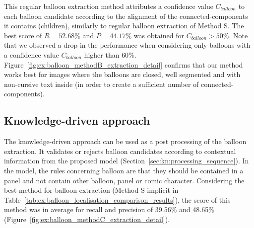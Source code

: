 This regular balloon extraction method attributes a confidence value $C_{balloon}$ to each balloon candidate according to the alignment of the connected-components it contains (children), similarly to regular balloon extraction of Method S.
The best score of $R=52.68\%$ and $P=44.17\%$ was obtained for $C_{balloon} > 50\%$.
Note that we observed a drop in the performance when considering only balloons with a confidence value $C_{balloon}$ higher than $60\%$.
Figure~\ref{fig:ex:balloon_methodB_extraction_detail} confirms that our method works best for images where the balloons are closed, well segmented and with non-cursive text inside (in order to create a sufficient number of connected-components).





\subsection{Knowledge-driven approach} %

The knowledge-driven approach can be used as a post processing of the balloon extraction.
It validates or rejects balloon candidates according to contextual information from the proposed model (Section~\ref{sec:kn:processing_sequence}).
In the model, the rules concerning balloon are that they should be contained in a panel and not contain other balloon, panel or comic character.
Considering the best method for balloon extraction (Method S implicit in Table~\ref{tab:ex:balloon_localisation_comparison_results}), the score of this method was in average for recall and precision of 39.56\% and 48.65\% (Figure~\ref{fig:ex:balloon_methodC_extraction_detail}).

